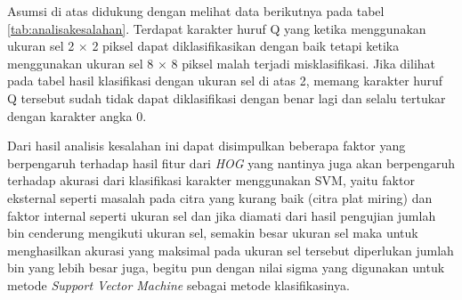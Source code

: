 \noindent Asumsi di atas didukung dengan melihat data berikutnya pada tabel \ref{tab:analisakesalahan}. Terdapat karakter huruf Q yang ketika menggunakan ukuran sel 2 $\times$ 2 piksel dapat diklasifikasikan dengan baik tetapi ketika menggunakan ukuran sel 8 $\times$ 8 piksel malah terjadi misklasifikasi. Jika dilihat pada tabel hasil klasifikasi dengan ukuran sel di atas 2, memang karakter huruf Q tersebut sudah tidak dapat diklasifikasi dengan benar lagi dan selalu tertukar dengan karakter angka 0.

\noindent Dari hasil analisis kesalahan ini dapat disimpulkan beberapa faktor yang berpengaruh terhadap hasil fitur dari \textit{HOG} yang nantinya juga akan berpengaruh terhadap akurasi dari klasifikasi karakter menggunakan SVM, yaitu faktor eksternal seperti masalah pada citra yang kurang baik (citra plat miring) dan faktor internal seperti ukuran sel dan jika diamati dari hasil pengujian jumlah bin cenderung mengikuti ukuran sel, semakin besar ukuran sel maka untuk menghasilkan akurasi yang maksimal pada ukuran sel tersebut diperlukan jumlah bin yang lebih besar juga, begitu pun dengan nilai sigma yang digunakan untuk metode \textit{Support Vector Machine} sebagai metode klasifikasinya.
\newpage
